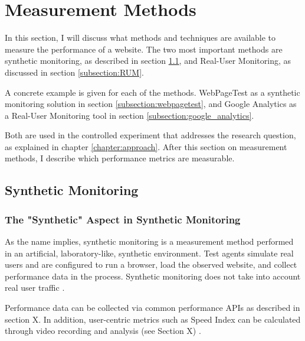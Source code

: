 

\section{Measurement Methods} %
\label{section:measurement_methods}

In this section, I will discuss what methods and techniques are available to measure the performance of a website.
The two most important methods are synthetic monitoring, as described in section \ref{subsection:synthetic_monitoring}, and Real-User Monitoring, as discussed in section \ref{subsection:RUM}.

A concrete example is given for each of the methods.
WebPageTest as a synthetic monitoring solution in section \ref{subsection:webpagetest},
and Google Analytics as a Real-User Monitoring tool in section \ref{subsection:google_analytics}.

Both are used in the controlled experiment that addresses the research question, as explained in chapter \ref{chapter:approach}.
After this section on measurement methods, I describe which performance metrics are measurable.




\subsection{Synthetic Monitoring}
\label{subsection:synthetic_monitoring}


\subsubsection{The "Synthetic" Aspect in Synthetic Monitoring} %

As the name implies, synthetic monitoring is a measurement method performed in an artificial, laboratory-like, synthetic environment.
Test agents simulate real users and are configured to run a browser, load the observed website, and collect performance data in the process.
Synthetic monitoring does not take into account real user traffic \cite{2015Cito}.

Performance data can be collected via common performance APIs as described in section X.
In addition, user-centric metrics such as Speed Index can be calculated through video recording and analysis (see Section X) \cite{2021Wingerath}.

